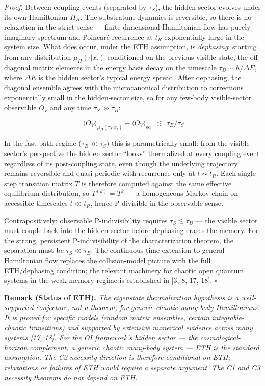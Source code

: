 \documentclass[
]{article}
\begin{document}
\emph{Proof.} Between coupling events (separated by \(\tau_S\)), the
hidden sector evolves under its own Hamiltonian \(H_H\). The substratum
dynamics is reversible, so there is no relaxation in the strict sense
--- finite-dimensional Hamiltonian flow has purely imaginary spectrum
and Poincaré recurrence at \(t_R\) exponentially large in the system
size. What does occur, under the ETH assumption, is \emph{dephasing}:
starting from any distribution \(\mu_H(\cdot | x_i)\) conditioned on the
previous visible state, the off-diagonal matrix elements in the energy
basis decay on the timescale \(\tau_B \sim \hbar / \Delta E\), where
\(\Delta E\) is the hidden sector's typical energy spread. After
dephasing, the diagonal ensemble agrees with the microcanonical
distribution to corrections exponentially small in the hidden-sector
size, so for any few-body visible-sector observable \(O_V\) and any time
\(\tau_S \gg \tau_B\):

\[\big| \langle O_V \rangle_{\mu_H(\tau_S | x_i)} - \langle O_V \rangle_{\text{eq}} \big| \;\lesssim\; \tau_B / \tau_S\]

In the fast-bath regime (\(\tau_B \ll \tau_S\)) this is parametrically
small: from the visible sector's perspective the hidden sector ``looks''
thermalized at every coupling event regardless of its post-coupling
state, even though the underlying trajectory remains reversible and
quasi-periodic with recurrence only at \(t \sim t_R\). Each single-step
transition matrix \(T\) is therefore computed against the same effective
equilibrium distribution, so \(T^{(k)} = T^k\) --- a homogeneous Markov
chain on accessible timescales \(t \ll t_R\), hence P-divisible in the
observable sense.

Contrapositively: observable P-indivisibility requires
\(\tau_S \lesssim \tau_B\) --- the visible sector must couple back into
the hidden sector before dephasing erases the memory. For the strong,
persistent P-indivisibility of the characterization theorem, the
separation must be \(\tau_S \ll \tau_B\). The continuous-time extension
to general Hamiltonian flow replaces the collision-model picture with
the full ETH/dephasing condition; the relevant machinery for chaotic
open quantum systems in the weak-memory regime is established in {[}3,
8, 17, 18{]}. \(\square\)

\textbf{Remark (Status of ETH).} \emph{The eigenstate thermalization
hypothesis is a well-supported conjecture, not a theorem, for generic
chaotic many-body Hamiltonians. It is proved for specific models (random
matrix ensembles, certain integrable-chaotic transitions) and supported
by extensive numerical evidence across many systems {[}17, 18{]}. For
the OI framework's hidden sector --- the cosmological-horizon
complement, a generic chaotic many-body system --- ETH is the standard
assumption. The C2 necessity direction is therefore conditional on ETH;
relaxations or failures of ETH would require a separate argument. The C1
and C3 necessity theorems do not depend on ETH.}
\end{document}
